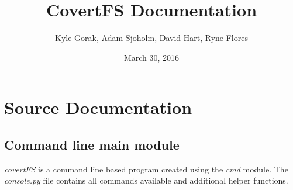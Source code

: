 \documentclass[letterpaper,12pt,openany,oneside]{sphinxmanual}
\title{CovertFS Documentation}
\date{March 30, 2016}
\author{Kyle Gorak, Adam Sjoholm, David Hart, Ryne Flores}
\begin{document}
\maketitle
\tableofcontents
{}\label{index::doc}



\chapter{Source Documentation}
\label{index:source-documentation}

\section{Command line main module}
\label{console:command-line-main-module}\label{console:module-covertFS.console}\label{console::doc}
\emph{covertFS} is a command line based program created using the \emph{cmd} module.
The \emph{console.py} file contains all commands available and additional helper
functions.
\end{document}

